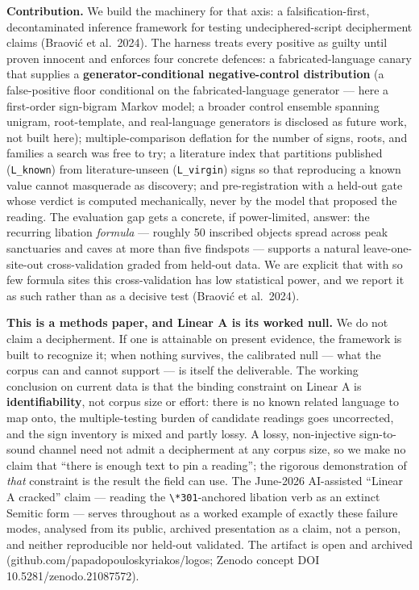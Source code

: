 \documentclass[
  10pt,
]{article}
\begin{document}
\textbf{Contribution.} We build the machinery for that axis: a
falsification-first, decontaminated inference framework for testing
undeciphered-script decipherment claims (Braović et al.~2024). The
harness treats every positive as guilty until proven innocent and
enforces four concrete defences: a fabricated-language canary that
supplies a \textbf{generator-conditional negative-control distribution}
(a false-positive floor conditional on the fabricated-language generator
--- here a first-order sign-bigram Markov model; a broader control
ensemble spanning unigram, root-template, and real-language generators
is disclosed as future work, not built here); multiple-comparison
deflation for the number of signs, roots, and families a search was free
to try; a literature index that partitions published (\texttt{L\_known})
from literature-unseen (\texttt{L\_virgin}) signs so that reproducing a
known value cannot masquerade as discovery; and pre-registration with a
held-out gate whose verdict is computed mechanically, never by the model
that proposed the reading. The evaluation gap gets a concrete, if
power-limited, answer: the recurring libation \emph{formula} --- roughly
50 inscribed objects spread across peak sanctuaries and caves at more
than five findspots --- supports a natural leave-one-site-out
cross-validation graded from held-out data. We are explicit that with so
few formula sites this cross-validation has low statistical power, and
we report it as such rather than as a decisive test (Braović et
al.~2024).

\textbf{This is a methods paper, and Linear A is its worked null.} We do
not claim a decipherment. If one is attainable on present evidence, the
framework is built to recognize it; when nothing survives, the
calibrated null --- what the corpus can and cannot support --- is itself
the deliverable. The working conclusion on current data is that the
binding constraint on Linear A is \textbf{identifiability}, not corpus
size or effort: there is no known related language to map onto, the
multiple-testing burden of candidate readings goes uncorrected, and the
sign inventory is mixed and partly lossy. A lossy, non-injective
sign-to-sound channel need not admit a decipherment at any corpus size,
so we make no claim that ``there is enough text to pin a reading''; the
rigorous demonstration of \emph{that} constraint is the result the field
can use. The June-2026 AI-assisted ``Linear A cracked'' claim ---
reading the \texttt{\textbackslash{}*301}-anchored libation verb as an
extinct Semitic form --- serves throughout as a worked example of
exactly these failure modes, analysed from its public, archived
presentation as a claim, not a person, and neither reproducible nor
held-out validated. The artifact is open and archived
(github.com/papadopouloskyriakos/logos; Zenodo concept DOI
10.5281/zenodo.21087572).
\end{document}
